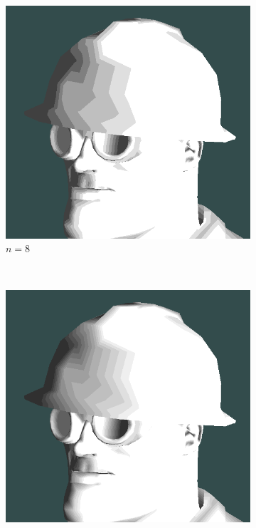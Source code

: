 \begin{figure}[h]
    \begin{subfigure}[b]{0.15\textwidth}
        \includegraphics[width=\textwidth]{img/cel-shading-n8.png}
        \caption{$n = 8$}
        \label{fig:cel-shading-n8}
    \end{subfigure}
    ~
    \begin{subfigure}[b]{0.15\textwidth}
        \includegraphics[width=\textwidth]{img/cel-shading-n16.png}

\end{subfigure}
\end{figure}
